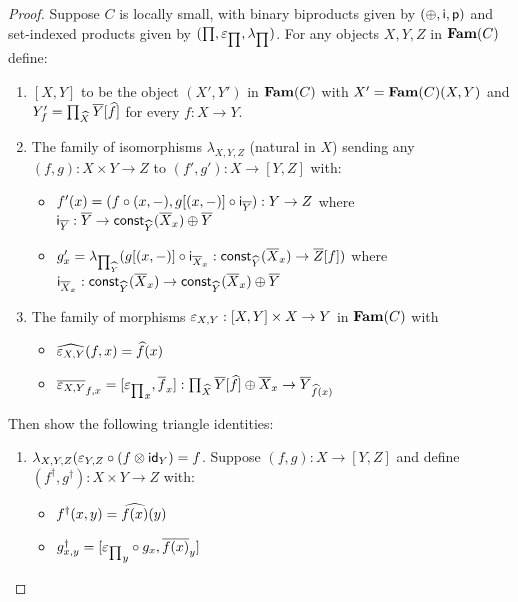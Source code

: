 \begin{proof}
Suppose $C$ is locally small, with binary biproducts given by $(\oplus,\mathsf{i},\mathsf{p})$ and set-indexed products
given by $(\prod,\varepsilon_{\prod},\lambda_{\prod})$. For any objects $X, Y, Z$ in $\mathbf{Fam}(C)$ define:

\begin{enumerate}
\item $[X, Y]$ to be the object $(X',Y')$ in $\mathbf{Fam}(C)$ with $X' = \mathbf{Fam}(C)(X,Y)$ and $Y'_f =
\prod_{\widehat{X}}\overline{Y}[\widehat{f}]$ for every $f: X \to Y$.
\item The family of isomorphisms $\lambda_{X,Y,Z}$ (natural in $X$) sending any $(f, g): X \times Y \to Z$ to
$(f', g'): X \to [Y, Z]$ with:
\begin{itemize}
\item $f'(x) = (f \circ (x, -), g[(x,-)] \circ \mathsf{i}_{\overline{Y}}):
Y \to Z$ where $\mathsf{i}_{\overline{Y}}: \overline{Y} \to \mathsf{const}_{\widehat{Y}}(\overline{X}_x) \oplus \overline{Y}$
\item $g'_x = \lambda_{\prod_{\widehat{Y}}}(g[(x,-)] \circ \mathsf{i}_{\overline{X}_x}:
\mathsf{const}_{\widehat{Y}}(\overline{X}_x) \to \overline{Z}[f])$ where $\mathsf{i}_{\overline{X}_x}: \mathsf{const}_{\widehat{Y}}(\overline{X}_x)
\to \mathsf{const}_{\widehat{Y}}(\overline{X}_x) \oplus \overline{Y}$
\end{itemize}
\item The family of morphisms $\varepsilon_{X,Y}: [X, Y] \times X \to Y$ in $\mathbf{Fam}(C)$ with
\begin{itemize}
\item $\widehat{\varepsilon_{X,Y}}(f, x) = \widehat{f}(x)$
\item $\overline{\varepsilon_{X,Y}}_{f, x} = [{\varepsilon_{\prod}}_x, \overline{f}_x]:
\prod_{\widehat{X}}\overline{Y}[\widehat{f}] \oplus \overline{X}_x \to \overline{Y}_{\widehat{f}(x)}$
\end{itemize}
\end{enumerate}

Then show the following triangle identities:
\begin{enumerate}
\item $\lambda_{X,Y,Z}(\varepsilon_{Y,Z} \circ (f \otimes \mathsf{id}_Y) = f$. Suppose $(f,g): X \to [Y,Z]$ and define
$(f^\dagger, g^\dagger): X \times Y \to Z$ with:
\begin{itemize}
\item $f^\dagger(x,y) = \widehat{f(x)}(y)$
\item $g^\dagger_{x,y} = [{\varepsilon_{\prod}}_y \circ g_x, \overline{f(x)}_y]$
\end{itemize}


\end{enumerate}
\end{proof}
